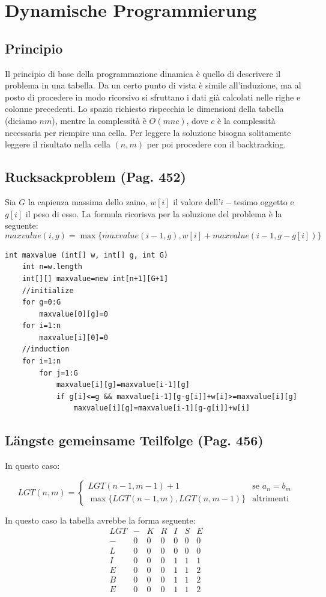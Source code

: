 \documentclass[a4paper]{book}
\newcommand{\lstIndent}{4}
\begin{document}
\section{Dynamische Programmierung}
\subsection{Principio}
Il principio di base della programmazione dinamica è quello di descrivere il problema in una tabella. Da un certo punto di vista è simile all'induzione, ma al posto di procedere in modo ricorsivo si sfruttano i dati già calcolati nelle righe e colonne precedenti. Lo spazio richiesto rispecchia le dimensioni della tabella (diciamo $nm$), mentre la complessità è $O(mnc)$, dove $c$ è la complessità necessaria per riempire una cella. Per leggere la soluzione bisogna solitamente leggere il risultato nella cella $(n,m)$ per poi procedere con il backtracking.
\subsection{Rucksackproblem (Pag. 452)}
Sia $G$ la capienza massima dello zaino, $w[i]$ il valore dell'$i-$tesimo oggetto e $g[i]$ il peso di esso. La formula ricorisva per la soluzione del problema è la seguente:
$$maxvalue(i,g)=\max \{maxvalue(i-1,g),w[i]+maxvalue(i-1,g-g[i])\}$$
\begin{lstlisting}[tabsize=\lstIndent]
int maxvalue (int[] w, int[] g, int G)
	int n=w.length
	int[][] maxvalue=new int[n+1][G+1]
	//initialize
	for g=0:G
		maxvalue[0][g]=0
	for i=1:n
		maxvalue[i][0]=0
	//induction
	for i=1:n	
		for j=1:G
			maxvalue[i][g]=maxvalue[i-1][g]
			if g[i]<=g && maxvalue[i-1][g-g[i]]+w[i]>=maxvalue[i][g]
				maxvalue[i][g]=maxvalue[i-1][g-g[i]]+w[i]
\end{lstlisting}
\subsection{Längste gemeinsame Teilfolge (Pag. 456)}
In questo caso:

\[
LGT(n,m) =\begin{cases}
LGT(n-1,m-1)+1 & \mbox{se } a_n=b_m \\
\max\{LGT(n-1,m),LGT(n,m-1)\} & \mbox{altrimenti}
\end{cases}
\]

In questo caso la tabella avrebbe la forma seguente:
$$\begin{array}{ccccccc}
LGT & - & K & R & I & S & E \\ 
- & 0 & 0 & 0 & 0 & 0 & 0 \\ 
L & 0 & 0 & 0 & 0 & 0 & 0 \\ 
I & 0 & 0 & 0 & 1 & 1 & 1 \\ 
E & 0 & 0 & 0 & 1 & 1 & 2 \\ 
B & 0 & 0 & 0 & 1 & 1 & 2 \\ 
E & 0 & 0 & 0 & 1 & 1 & 2
\end{array} $$
\end{document}
